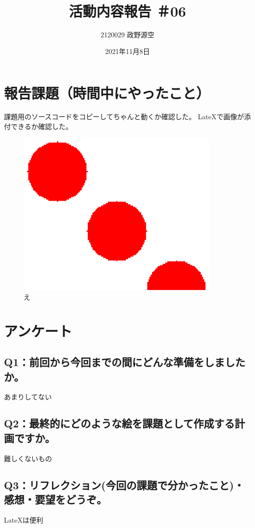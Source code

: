 \documentclass[12pt,a4j]{jarticle}
\begin{document}
\title{活動内容報告 ＃06}
\author{2120029 政野源空}
\date{2021年11月8日}
\maketitle

\section{報告課題（時間中にやったこと）}

課題用のソースコードをコピーしてちゃんと動くか確認した。
LateXで画像が添付できるか確認した。

\begin{figure}[htbp]
  \begin{center}
  \includegraphics[width=100mm]{mypicture.ps}
  \caption{え}
  \end{center}
  \end{figure}
  


\section{アンケート}

\subsection{Q1：前回から今回までの間にどんな準備をしましたか。}

あまりしてない

\subsection{Q2：最終的にどのような絵を課題として作成する計画ですか。}

難しくないもの

\subsection{Q3：リフレクション(今回の課題で分かったこと)・感想・要望をどうぞ。}

LateXは便利
\end{document}
